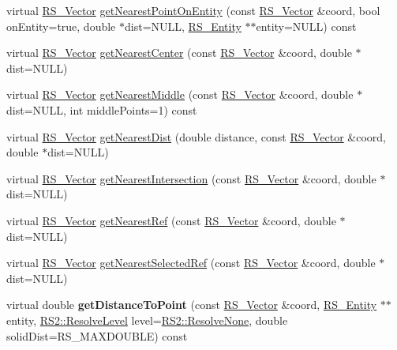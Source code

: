 \begin{DoxyCompactItemize}
\item 
virtual \hyperlink{classRS__Vector}{R\-S\-\_\-\-Vector} \hyperlink{classRS__EntityContainer_ad511a33d1ad7707788a5893df09347b7}{get\-Nearest\-Point\-On\-Entity} (const \hyperlink{classRS__Vector}{R\-S\-\_\-\-Vector} \&coord, bool on\-Entity=true, double $\ast$dist=N\-U\-L\-L, \hyperlink{classRS__Entity}{R\-S\-\_\-\-Entity} $\ast$$\ast$entity=N\-U\-L\-L) const 
\item 
virtual \hyperlink{classRS__Vector}{R\-S\-\_\-\-Vector} \hyperlink{classRS__EntityContainer_a861b1604b2d739a52577dc9cff99891c}{get\-Nearest\-Center} (const \hyperlink{classRS__Vector}{R\-S\-\_\-\-Vector} \&coord, double $\ast$dist=N\-U\-L\-L)
\item 
virtual \hyperlink{classRS__Vector}{R\-S\-\_\-\-Vector} \hyperlink{classRS__EntityContainer_aec0db74fc4011d7955e4443f79a42aa5}{get\-Nearest\-Middle} (const \hyperlink{classRS__Vector}{R\-S\-\_\-\-Vector} \&coord, double $\ast$dist=N\-U\-L\-L, int middle\-Points=1) const 
\item 
virtual \hyperlink{classRS__Vector}{R\-S\-\_\-\-Vector} \hyperlink{classRS__EntityContainer_a5a46efb8138389da04826716ada5d9e0}{get\-Nearest\-Dist} (double distance, const \hyperlink{classRS__Vector}{R\-S\-\_\-\-Vector} \&coord, double $\ast$dist=N\-U\-L\-L)
\item 
virtual \hyperlink{classRS__Vector}{R\-S\-\_\-\-Vector} \hyperlink{classRS__EntityContainer_a81c437f8d69dd7512eaf2993bbf1335c}{get\-Nearest\-Intersection} (const \hyperlink{classRS__Vector}{R\-S\-\_\-\-Vector} \&coord, double $\ast$dist=N\-U\-L\-L)
\item 
virtual \hyperlink{classRS__Vector}{R\-S\-\_\-\-Vector} \hyperlink{classRS__EntityContainer_a1ee77d9793910900b4e929700028a5fd}{get\-Nearest\-Ref} (const \hyperlink{classRS__Vector}{R\-S\-\_\-\-Vector} \&coord, double $\ast$dist=N\-U\-L\-L)
\item 
virtual \hyperlink{classRS__Vector}{R\-S\-\_\-\-Vector} \hyperlink{classRS__EntityContainer_a37111b0bfc94f0c4e8b0d81c170775b8}{get\-Nearest\-Selected\-Ref} (const \hyperlink{classRS__Vector}{R\-S\-\_\-\-Vector} \&coord, double $\ast$dist=N\-U\-L\-L)
\item 
\hypertarget{classRS__EntityContainer_afafbb4dce43e5e9a461c9962df45919b}{virtual double {\bfseries get\-Distance\-To\-Point} (const \hyperlink{classRS__Vector}{R\-S\-\_\-\-Vector} \&coord, \hyperlink{classRS__Entity}{R\-S\-\_\-\-Entity} $\ast$$\ast$entity, \hyperlink{classRS2_a1b2c5e3a3e9d1b03a9564229255faa20}{R\-S2\-::\-Resolve\-Level} level=\hyperlink{classRS2_a1b2c5e3a3e9d1b03a9564229255faa20aecb7396f39bc313ad8903c8a5fac5a50}{R\-S2\-::\-Resolve\-None}, double solid\-Dist=R\-S\-\_\-\-M\-A\-X\-D\-O\-U\-B\-L\-E) const }\label{classRS__EntityContainer_afafbb4dce43e5e9a461c9962df45919b}


\end{DoxyCompactItemize}

